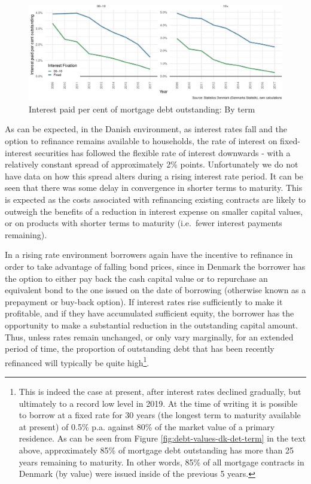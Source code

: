 \documentclass[
]{book}
\begin{document}
\begin{figure}
\centering
\includegraphics{figures/interest-rate-composition-dk-simp-1.pdf}
\caption{\label{fig:interest-rate-composition-dk-simp}Interest paid per cent of mortgage debt outstanding: By term}
\end{figure}

As can be expected, in the Danish environment, as interest rates fall and the option to refinance remains available to households, the rate of interest on fixed-interest securities has followed the flexible rate of interest downwards - with a relatively constant spread of approximately 2\% points. Unfortunately we do not have data on how this spread alters during a rising interest rate period. It can be seen that there was some delay in convergence in shorter terms to maturity. This is expected as the costs associated with refinancing existing contracts are likely to outweigh the benefits of a reduction in interest expense on smaller capital values, or on products with shorter terms to maturity (i.e.~fewer interest payments remaining).

In a rising rate environment borrowers again have the incentive to refinance in order to take advantage of falling bond prices, since in Denmark the borrower has the option to either pay back the cash capital value or to repurchase an equivalent bond to the one issued on the date of borrowing (otherwise known as a prepayment or buy-back option). If interest rates rise sufficiently to make it profitable, and if they have accumulated sufficient equity, the borrower has the opportunity to make a substantial reduction in the outstanding capital amount. Thus, unless rates remain unchanged, or only vary marginally, for an extended period of time, the proportion of outstanding debt that has been recently refinanced will typically be quite high\footnote{This is indeed the case at present, after interest rates declined gradually, but ultimately to a record low level in 2019. At the time of writing it is possible to borrow at a fixed rate for 30 years (the longest term to maturity available at present) of 0.5\% p.a. against 80\% of the market value of a primary residence. As can be seen from Figure \ref{fig:debt-values-dk-det-term} in the text above, approximately 85\% of mortgage debt outstanding has more than 25 years remaining to maturity. In other words, 85\% of all mortgage contracts in Denmark (by value) were issued inside of the previous 5 years.}.
\end{document}

